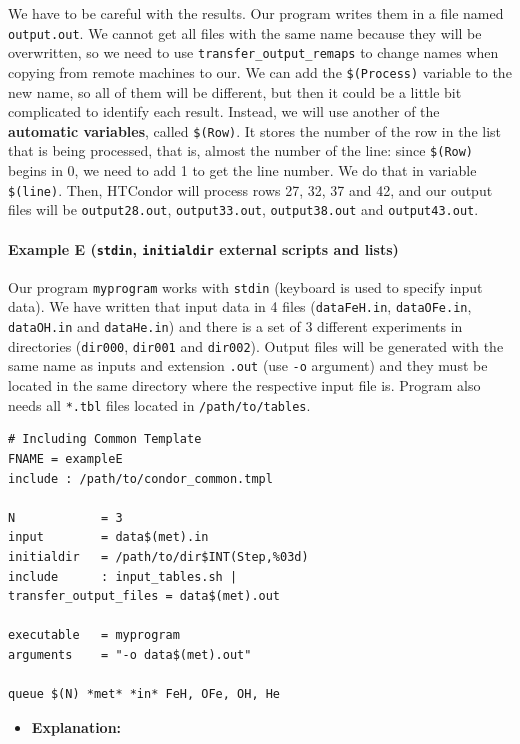 \documentclass[a4paper,10pt]{article}
\begin{document}
We have to be careful with the results. Our program writes them in a file named
\texttt{output.out}. We cannot get all files with the same name because they will be
overwritten, so we need to use \texttt{transfer\_output\_remaps} to change names when
copying from remote machines to our. We can add the \texttt{\$(Process)} variable to the
new name, so all of them will be different, but then it could be a little bit
complicated to identify each result. Instead, we will use another of the
\textbf{automatic variables}, called \texttt{\$(Row)}. It stores the number of the row in the
list that is being processed, that is, almost the number of the line: since
\texttt{\$(Row)} begins in 0, we need to add 1 to get the line number. We do that in
variable \texttt{\$(line)}. Then, HTCondor will process rows 27, 32, 37 and 42, and our
output files will be \texttt{output28.out}, \texttt{output33.out}, \texttt{output38.out} and
\texttt{output43.out}.

\paragraph{Example E (\texttt{stdin}, \texttt{initialdir} external scripts and lists)}
\label{sec:orgc345e80}

Our program \texttt{myprogram} works with \texttt{stdin} (keyboard is used to specify input
data). We have written that input data in 4 files (\texttt{dataFeH.in}, \texttt{dataOFe.in},
\texttt{dataOH.in} and \texttt{dataHe.in}) and there is a set of 3 different experiments in
directories (\texttt{dir000}, \texttt{dir001} and \texttt{dir002}). Output files will be generated
with the same name as inputs and extension \texttt{.out} (use \texttt{-o} argument) and they
must be located in the same directory where the respective input file
is. Program also needs all \texttt{*.tbl} files located in \texttt{/path/to/tables}.

\begin{verbatim}
# Including Common Template
FNAME = exampleE
include : /path/to/condor_common.tmpl

N            = 3
input        = data$(met).in
initialdir   = /path/to/dir$INT(Step,%03d)
include      : input_tables.sh |
transfer_output_files = data$(met).out

executable   = myprogram
arguments    = "-o data$(met).out"

queue $(N) *met* *in* FeH, OFe, OH, He
\end{verbatim}

\begin{itemize}
\item \textbf{Explanation:}
\end{itemize}
\end{document}
